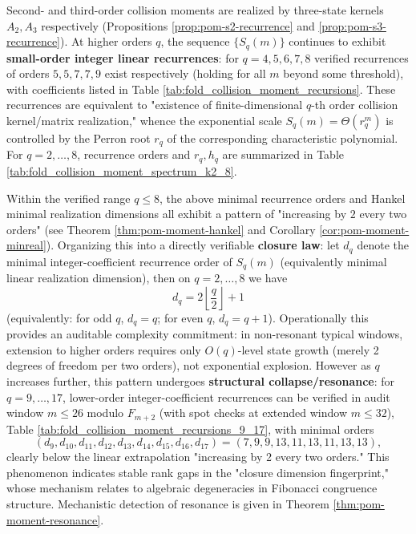 \begin{remark}\label{rem:pom-moment-rec}
Second- and third-order collision moments are realized by three-state kernels \(A_2,A_3\) respectively (Propositions \ref{prop:pom-s2-recurrence} and \ref{prop:pom-s3-recurrence}). At higher orders \(q\), the sequence \(\{S_q(m)\}\) continues to exhibit \textbf{small-order integer linear recurrences}: for \(q=4,5,6,7,8\) verified recurrences of orders \(5,5,7,7,9\) exist respectively (holding for all \(m\) beyond some threshold), with coefficients listed in Table \ref{tab:fold_collision_moment_recursions}. These recurrences are equivalent to "existence of finite-dimensional \(q\)-th order collision kernel/matrix realization," whence the exponential scale \(S_q(m)=\Theta(r_q^m)\) is controlled by the Perron root \(r_q\) of the corresponding characteristic polynomial.
For \(q=2,\dots,8\), recurrence orders and \(r_q,h_q\) are summarized in Table \ref{tab:fold_collision_moment_spectrum_k2_8}.


Within the verified range \(q\le 8\), the above minimal recurrence orders and Hankel minimal realization dimensions all exhibit a pattern of "increasing by \(2\) every two orders" (see Theorem \ref{thm:pom-moment-hankel} and Corollary \ref{cor:pom-moment-minreal}).
Organizing this into a directly verifiable \textbf{closure law}: let \(d_q\) denote the minimal integer-coefficient recurrence order of \(S_q(m)\) (equivalently minimal linear realization dimension), then on \(q=2,\dots,8\) we have
\[
\boxed{\;
d_q = 2\left\lfloor \frac{q}{2}\right\rfloor+1\;}
\]
(equivalently: for odd \(q\), \(d_q=q\); for even \(q\), \(d_q=q+1\)).
Operationally this provides an auditable complexity commitment: in non-resonant typical windows, extension to higher orders requires only \(O(q)\)-level state growth (merely 2 degrees of freedom per two orders), not exponential explosion.
However as \(q\) increases further, this pattern undergoes \textbf{structural collapse/resonance}: for \(q=9,\dots,17\), lower-order integer-coefficient recurrences can be verified in audit window \(m\le 26\) modulo \(F_{m+2}\) (with spot checks at extended window \(m\le 32\)), Table \ref{tab:fold_collision_moment_recursions_9_17}, with minimal orders
\[
(d_9,d_{10},d_{11},d_{12},d_{13},d_{14},d_{15},d_{16},d_{17})=(7,9,9,13,11,13,11,13,13),
\]
clearly below the linear extrapolation "increasing by 2 every two orders." This phenomenon indicates stable rank gaps in the "closure dimension fingerprint," whose mechanism relates to algebraic degeneracies in Fibonacci congruence structure. Mechanistic detection of resonance is given in Theorem \ref{thm:pom-moment-resonance}.
\end{remark}

